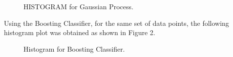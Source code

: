 \documentclass[12pt]{article}
\begin{document}
\begin{figure}[!t]
\centering
{}
\hfil
{}
\caption{HISTOGRAM for Gaussian Process.}
\label{fig_sim}
\end{figure}


Using the Boosting Classifier, for the same set of data points, the following histogram plot was obtained as shown in Figure 2.

\begin{figure}[!t]
\centering
{}
\hfil
{}
\caption{Histogram for Boosting Classifier.}
\label{fig_sim}
\end{figure}
\end{document}
